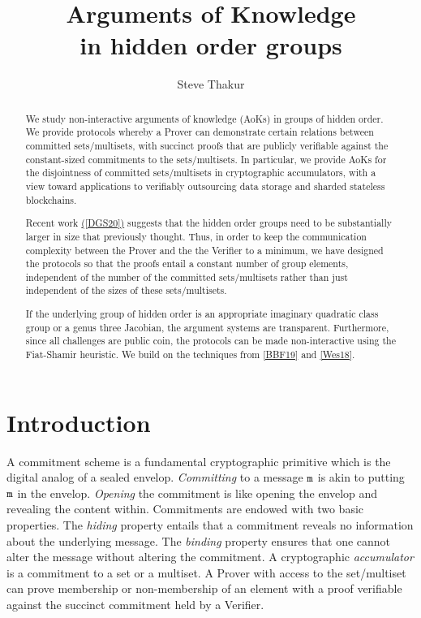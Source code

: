 \documentclass[11pt, lettersize, notitlepage, leqno, footskip=0.6cm]{article}
\numberwithin{equation}{section}
\begin{document}
 
\title{Arguments of Knowledge\\ in hidden order groups}
\author{Steve Thakur}
\affil{}
\date{\vspace{-6ex}}
 
\maketitle

\begin{abstract} We study non-interactive arguments of knowledge (AoKs) in groups of hidden order. We provide protocols whereby a Prover can demonstrate certain relations between committed sets/multisets, with succinct proofs that are publicly verifiable against the constant-sized commitments to the sets/multisets. In particular, we provide AoKs for the disjointness of committed sets/multisets in cryptographic accumulators, with a view toward applications to verifiably outsourcing data storage and sharded stateless blockchains. 

Recent work \hyperlink{DGS20}{([DGS20])} suggests that the hidden order groups need to be substantially larger in size that previously thought. Thus, in order to keep the communication complexity between the Prover and the the Verifier to a minimum, we have designed the protocols so that the proofs entail a constant number of group elements, independent of the number of the committed sets/multisets rather than just independent of the sizes of these sets/multisets.

If the underlying group of hidden order is an appropriate imaginary quadratic class group or a genus three Jacobian, the argument systems are transparent. Furthermore, since all challenges are public coin, the protocols can be made non-interactive using the Fiat-Shamir heuristic. We build on the techniques from \hyperlink{BBF19}{[BBF19]} and \hyperlink{Wes18}{[Wes18]}.

\end{abstract}

\section{\fontsize{12}{12}\selectfont Introduction  }

A commitment scheme is a fundamental cryptographic primitive which is the digital analog of a sealed envelop. \textit{Committing} to a message $\tt{m}$ is akin to putting $\tt{m}$ in the envelop. \textit{Opening} the commitment is like opening the envelop and revealing the content within. Commitments are endowed with two basic properties. The \textit{hiding} property entails that a commitment reveals no information about the underlying message. The \textit{binding} property ensures that one cannot alter the message without altering the commitment. A cryptographic \textit{accumulator} is a commitment to a set or a multiset. A Prover with access to the set/multiset can prove membership or non-membership of an element with a proof verifiable against the succinct commitment held by a Verifier. 
\end{document}
